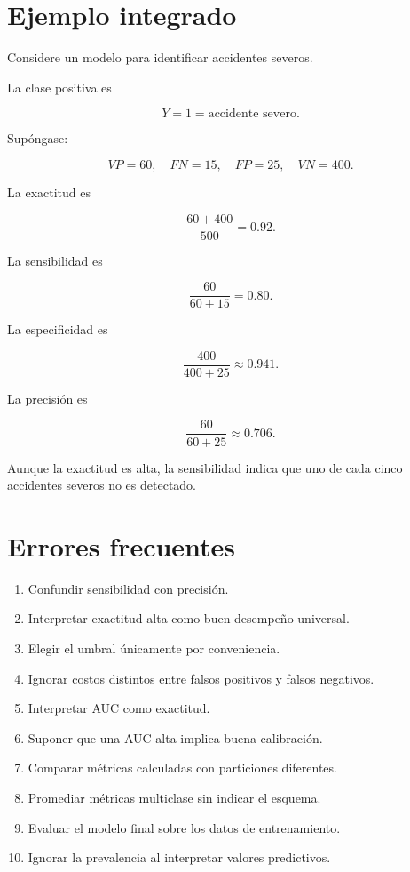 \documentclass[
  spanish,
  11pt,
  letterpaper,
  DIV=11,
  numbers=noendperiod]{scrreprt}
\providecommand{\tightlist}{%
  \setlength{\itemsep}{0pt}\setlength{\parskip}{0pt}}
\theoremstyle{definition}
\theoremstyle{plain}
\theoremstyle{definition}
\theoremstyle{remark}
\begin{document}
\section{Ejemplo integrado}\label{ejemplo-integrado-3}

Considere un modelo para identificar accidentes severos.

La clase positiva es

\[
Y=1
=
\text{accidente severo}.
\]

Supóngase:

\[
VP=60,
\quad
FN=15,
\quad
FP=25,
\quad
VN=400.
\]

La exactitud es

\[
\frac{60+400}{500}
=
0.92.
\]

La sensibilidad es

\[
\frac{60}{60+15}
=
0.80.
\]

La especificidad es

\[
\frac{400}{400+25}
\approx 0.941.
\]

La precisión es

\[
\frac{60}{60+25}
\approx 0.706.
\]

Aunque la exactitud es alta, la sensibilidad indica que uno de cada
cinco accidentes severos no es detectado.

\section{Errores frecuentes}\label{errores-frecuentes-5}

\begin{enumerate}
\def\labelenumi{\arabic{enumi}.}
\tightlist
\item
  Confundir sensibilidad con precisión.
\item
  Interpretar exactitud alta como buen desempeño universal.
\item
  Elegir el umbral únicamente por conveniencia.
\item
  Ignorar costos distintos entre falsos positivos y falsos negativos.
\item
  Interpretar AUC como exactitud.
\item
  Suponer que una AUC alta implica buena calibración.
\item
  Comparar métricas calculadas con particiones diferentes.
\item
  Promediar métricas multiclase sin indicar el esquema.
\item
  Evaluar el modelo final sobre los datos de entrenamiento.
\item
  Ignorar la prevalencia al interpretar valores predictivos.
\end{enumerate}
\end{document}
